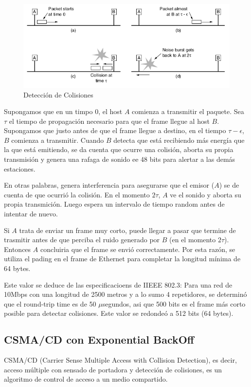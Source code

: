 \begin{figure}[H]
	\centering
	\includegraphics[width=\textwidth
]{images/deteccion-colisiones.png}
	\caption[Detección de Colisiones]{Detección de Colisiones}
	\label{fig:deteccion-colisiones}
\end{figure}

Supongamos que en un timpo 0, el host \(A\) comienza a transmitir el paquete. Sea   \(\tau\) el tiempo de propagación necesario para que el frame llegue al host \(B\). Supongamos que justo antes de que el frame llegue a destino, en el tiempo \(\tau-\epsilon\), \(B\) comienza a transmitir. Cuando \(B\) detecta que está recibiendo más energía que la que está emitiendo, se da cuenta que ocurre una colisión, aborta su propia transmisión y genera una rafaga de sonido ee 48 bits para alertar a las demás estaciones. 

En otras palabras, genera interferencia para asegurarse que el emisor (\(A\)) se de cuenta de que ocurrió la colisión. En el momento \(2\tau\), \(A\) ve el sonido y aborta su propia transmición. Luego espera un intervalo de tiempo random antes de intentar de nuevo.

Si \(A\) trata de enviar un frame muy corto, puede llegar a pasar que termine de trasmitir antes de que  perciba el ruido generado por \(B\) (en el momento \(2\tau\)). Entonces \(A\) concluiria que el frame se envió correctamente. Por esta razón, se utiliza el pading en el frame de Ethernet para completar la longitud mínima de 64 bytes.

Este valor se deduce de las especificacioens de IIEEE 802.3: Para una red de 10Mbps con una longitud de 2500 metros y a lo sumo 4 repetidores, se determinó que el round-trip time es de 50 \(\mu\)segundos, asi que 500 bits es el frame más corto posible para detectar colisiones. Este valor se redondeó a 512 bits (64 bytes).

\subsection{CSMA/CD con Exponential BackOff}\label{section::csma}
CSMA/CD (Carrier Sense Multiple Access with Collision Detection), es decir, acceso múltiple con sensado de portadora y detección de colisiones, es un algoritmo de control de acceso a un medio compartido.

